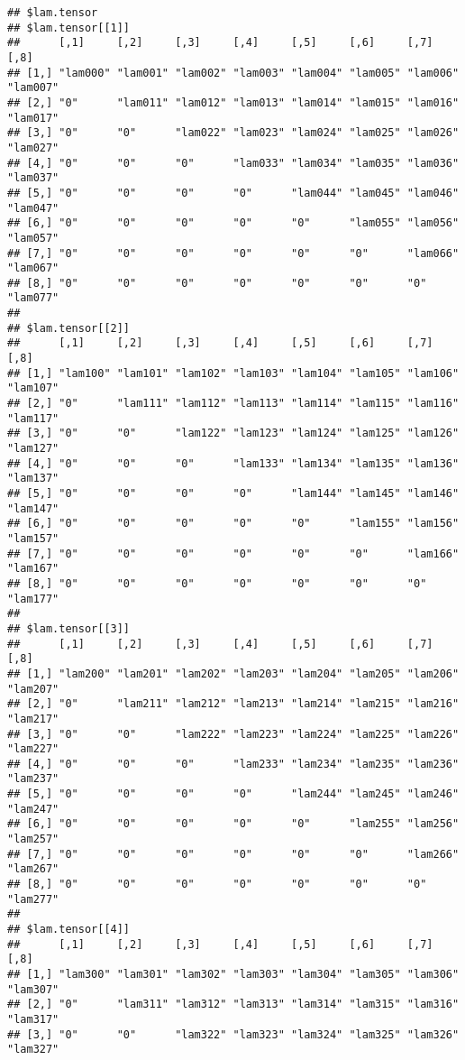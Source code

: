 \documentclass[
]{article}
\begin{document}
\begin{verbatim}
## $lam.tensor
## $lam.tensor[[1]]
##      [,1]     [,2]     [,3]     [,4]     [,5]     [,6]     [,7]     [,8]    
## [1,] "lam000" "lam001" "lam002" "lam003" "lam004" "lam005" "lam006" "lam007"
## [2,] "0"      "lam011" "lam012" "lam013" "lam014" "lam015" "lam016" "lam017"
## [3,] "0"      "0"      "lam022" "lam023" "lam024" "lam025" "lam026" "lam027"
## [4,] "0"      "0"      "0"      "lam033" "lam034" "lam035" "lam036" "lam037"
## [5,] "0"      "0"      "0"      "0"      "lam044" "lam045" "lam046" "lam047"
## [6,] "0"      "0"      "0"      "0"      "0"      "lam055" "lam056" "lam057"
## [7,] "0"      "0"      "0"      "0"      "0"      "0"      "lam066" "lam067"
## [8,] "0"      "0"      "0"      "0"      "0"      "0"      "0"      "lam077"
## 
## $lam.tensor[[2]]
##      [,1]     [,2]     [,3]     [,4]     [,5]     [,6]     [,7]     [,8]    
## [1,] "lam100" "lam101" "lam102" "lam103" "lam104" "lam105" "lam106" "lam107"
## [2,] "0"      "lam111" "lam112" "lam113" "lam114" "lam115" "lam116" "lam117"
## [3,] "0"      "0"      "lam122" "lam123" "lam124" "lam125" "lam126" "lam127"
## [4,] "0"      "0"      "0"      "lam133" "lam134" "lam135" "lam136" "lam137"
## [5,] "0"      "0"      "0"      "0"      "lam144" "lam145" "lam146" "lam147"
## [6,] "0"      "0"      "0"      "0"      "0"      "lam155" "lam156" "lam157"
## [7,] "0"      "0"      "0"      "0"      "0"      "0"      "lam166" "lam167"
## [8,] "0"      "0"      "0"      "0"      "0"      "0"      "0"      "lam177"
## 
## $lam.tensor[[3]]
##      [,1]     [,2]     [,3]     [,4]     [,5]     [,6]     [,7]     [,8]    
## [1,] "lam200" "lam201" "lam202" "lam203" "lam204" "lam205" "lam206" "lam207"
## [2,] "0"      "lam211" "lam212" "lam213" "lam214" "lam215" "lam216" "lam217"
## [3,] "0"      "0"      "lam222" "lam223" "lam224" "lam225" "lam226" "lam227"
## [4,] "0"      "0"      "0"      "lam233" "lam234" "lam235" "lam236" "lam237"
## [5,] "0"      "0"      "0"      "0"      "lam244" "lam245" "lam246" "lam247"
## [6,] "0"      "0"      "0"      "0"      "0"      "lam255" "lam256" "lam257"
## [7,] "0"      "0"      "0"      "0"      "0"      "0"      "lam266" "lam267"
## [8,] "0"      "0"      "0"      "0"      "0"      "0"      "0"      "lam277"
## 
## $lam.tensor[[4]]
##      [,1]     [,2]     [,3]     [,4]     [,5]     [,6]     [,7]     [,8]    
## [1,] "lam300" "lam301" "lam302" "lam303" "lam304" "lam305" "lam306" "lam307"
## [2,] "0"      "lam311" "lam312" "lam313" "lam314" "lam315" "lam316" "lam317"
## [3,] "0"      "0"      "lam322" "lam323" "lam324" "lam325" "lam326" "lam327"

\end{verbatim}
\end{document}
